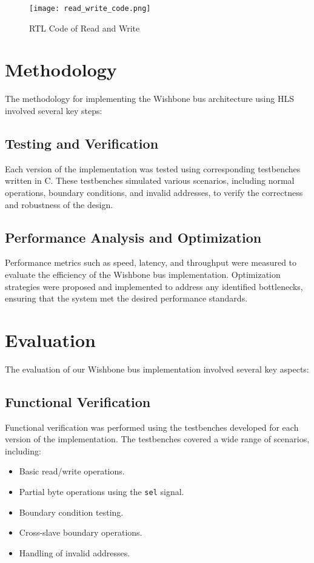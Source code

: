\documentclass[conference]{IEEEtran}
\begin{document}
\begin{figure}[htbp]
    \centering
    \texttt{[image: read\_write\_code.png]}
    \caption{RTL Code of Read and Write}
    \label{read_write_code}
\end{figure}



\section{Methodology}

The methodology for implementing the Wishbone bus architecture using HLS involved several key steps:


\subsection{Testing and Verification}
Each version of the implementation was tested using corresponding testbenches written in C. These testbenches simulated various scenarios, including normal operations, boundary conditions, and invalid addresses, to verify the correctness and robustness of the design.

\subsection{Performance Analysis and Optimization}
Performance metrics such as speed, latency, and throughput were measured to evaluate the efficiency of the Wishbone bus implementation. Optimization strategies were proposed and implemented to address any identified bottlenecks, ensuring that the system met the desired performance standards.




\section{Evaluation}

The evaluation of our Wishbone bus implementation involved several key aspects:

\subsection{Functional Verification}
Functional verification was performed using the testbenches developed for each version of the implementation. The testbenches covered a wide range of scenarios, including:
\begin{itemize}
    \item Basic read/write operations.
    \item Partial byte operations using the \texttt{sel} signal.
    \item Boundary condition testing.
    \item Cross-slave boundary operations.
    \item Handling of invalid addresses.
\end{itemize}
\end{document}
